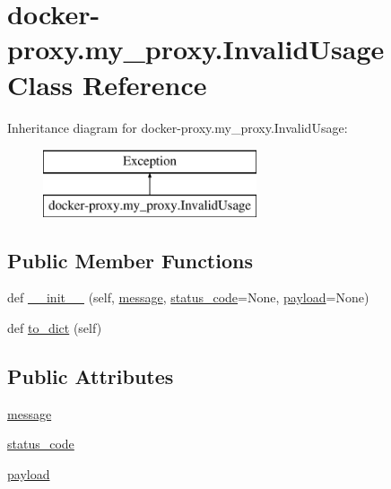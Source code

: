 \hypertarget{classdocker-proxy_1_1my__proxy_1_1_invalid_usage}{}\section{docker-\/proxy.my\+\_\+proxy.\+Invalid\+Usage Class Reference}
\label{classdocker-proxy_1_1my__proxy_1_1_invalid_usage}
Inheritance diagram for docker-\/proxy.my\+\_\+proxy.\+Invalid\+Usage\+:\begin{figure}[H]
\begin{center}
\leavevmode
\includegraphics[height=2.000000cm]{classdocker-proxy_1_1my__proxy_1_1_invalid_usage}
\end{center}
\end{figure}
\subsection*{Public Member Functions}
\begin{DoxyCompactItemize}
\item 
def \hyperlink{classdocker-proxy_1_1my__proxy_1_1_invalid_usage_aa785dfd5e9946eb87e2a94d4544bc656}{\+\_\+\+\_\+init\+\_\+\+\_\+} (self, \hyperlink{classdocker-proxy_1_1my__proxy_1_1_invalid_usage_aa61d504376bb9479db82cb7d97c70011}{message}, \hyperlink{classdocker-proxy_1_1my__proxy_1_1_invalid_usage_aa06f3c7722ee51c93e799a0e57f67a32}{status\+\_\+code}=None, \hyperlink{classdocker-proxy_1_1my__proxy_1_1_invalid_usage_a658b9343c56fde3e1753fe8ad1e1a158}{payload}=None)
\item 
def \hyperlink{classdocker-proxy_1_1my__proxy_1_1_invalid_usage_a50b7849f7141fc1455ace3691a9417a7}{to\+\_\+dict} (self)
\end{DoxyCompactItemize}
\subsection*{Public Attributes}
\begin{DoxyCompactItemize}
\item 
\hyperlink{classdocker-proxy_1_1my__proxy_1_1_invalid_usage_aa61d504376bb9479db82cb7d97c70011}{message}
\item 
\hyperlink{classdocker-proxy_1_1my__proxy_1_1_invalid_usage_a6503499a33bc2de008fb69c03f453eec}{status\+\_\+code}
\item 
\hyperlink{classdocker-proxy_1_1my__proxy_1_1_invalid_usage_a658b9343c56fde3e1753fe8ad1e1a158}{payload}
\end{DoxyCompactItemize}
